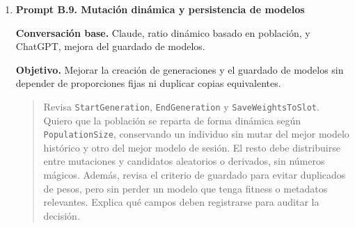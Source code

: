 {\begin{enumerate}[leftmargin=*,itemsep=0.2\baselineskip,topsep=2pt,parsep=0pt,partopsep=0pt]
  \textbf{Conversación base.} Claude, análisis de regresión y errores en stops, con atención a \texttt{STOP\_VIOLATION}.

  \textbf{Objetivo.} Entender por qué una modificación local podía empeorar el comportamiento global, especialmente en stops.

  \promptDepurado
  \begin{quote}
  \small
  Compara dos ejecuciones del mismo modelo antes y después de los cambios en intersecciones, fitness y red neuronal. Usa los informes y CSV para cuantificar la caída de rendimiento. Localiza qué razones de muerte aumentan, qué cambios de Blueprint coinciden temporalmente y qué hipótesis explican la regresión. No atribuyas causalidad sin prueba: separa correlación, evidencia directa y comprobaciones pendientes. Propón una secuencia de pruebas cortas en la que solo cambie un componente cada vez.
  \end{quote}

  \textbf{Respuesta aprovechada.} Se aprovechó la metodología de comparar el mismo modelo bajo condiciones próximas, localizar cambios de Blueprints y mirar razones de muerte antes de aceptar una mejora.

  \textbf{Comprobación realizada.} Se contrastaron los bloques de referencia y seguimiento de junio, con especial atención a \texttt{STOP\_VIOLATION}, \texttt{STOP\_VIOLATION\_TIMEOUT} y a la variabilidad entre sesiones.

  \textbf{Uso final en el proyecto.} La conclusión experimental indica que una mejora local del fitness puede degradar stops o generalización, por lo que la versión estable debe definirse por bloques reproducibles.

  \item \textbf{Prompt B.9. Mutación dinámica y persistencia de modelos}

  \textbf{Conversación base.} Claude, ratio dinámico basado en población, y ChatGPT, mejora del guardado de modelos.

  \textbf{Objetivo.} Mejorar la creación de generaciones y el guardado de modelos sin depender de proporciones fijas ni duplicar copias equivalentes.

  \promptDepurado
  \begin{quote}
  \small
  Revisa \texttt{StartGeneration}, \texttt{EndGeneration} y \texttt{SaveWeightsToSlot}. Quiero que la población se reparta de forma dinámica según \texttt{PopulationSize}, conservando un individuo sin mutar del mejor modelo histórico y otro del mejor modelo de sesión. El resto debe distribuirse entre mutaciones y candidatos aleatorios o derivados, sin números mágicos. Además, revisa el criterio de guardado para evitar duplicados de pesos, pero sin perder un modelo que tenga fitness o metadatos relevantes. Explica qué campos deben registrarse para auditar la decisión.
  \end{quote}


\end{enumerate}}
